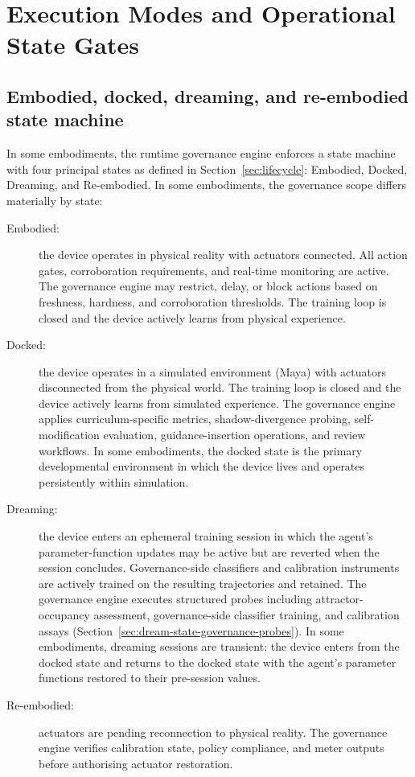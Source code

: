 \documentclass[a4paper,12pt]{article}
\begin{document}
\section{Execution Modes and Operational State Gates}


\subsection{Embodied, docked, dreaming, and re-embodied state machine}
\label{sec:state-machine}

In some embodiments, the runtime governance engine enforces a state
machine with four principal states as defined in
Section~\ref{sec:lifecycle}: Embodied, Docked, Dreaming, and
Re-embodied. In some embodiments, the governance scope differs
materially by state:

\begin{description}
  \item[Embodied:] the device operates in physical reality with
    actuators connected. All action gates, corroboration requirements,
    and real-time monitoring are active. The governance engine may
    restrict, delay, or block actions based on freshness, hardness, and
    corroboration thresholds. The training loop is closed and the device
    actively learns from physical experience.
  \item[Docked:] the device operates in a simulated environment (Maya)
    with actuators disconnected from the physical world. The training
    loop is closed and the device actively learns from simulated
    experience. The governance engine applies curriculum-specific
    metrics, shadow-divergence probing, self-modification evaluation,
    guidance-insertion operations, and review workflows. In some
    embodiments, the docked state is the primary developmental
    environment in which the device lives and operates persistently
    within simulation.
  \item[Dreaming:] the device enters an ephemeral training session
    in which the agent's parameter-function updates may be active
    but are reverted when the session concludes. Governance-side
    classifiers and calibration instruments are actively trained on
    the resulting trajectories and retained. The governance engine
    executes structured probes including attractor-occupancy
    assessment, governance-side classifier training, and calibration
    assays (Section~\ref{sec:dream-state-governance-probes}). In some
    embodiments, dreaming sessions are transient: the device enters
    from the docked state and returns to the docked state with the
    agent's parameter functions restored to their pre-session
    values.
  \item[Re-embodied:] actuators are pending reconnection to physical
    reality. The governance engine verifies calibration state, policy
    compliance, and meter outputs before authorising actuator
    restoration.
\end{description}
\end{document}
